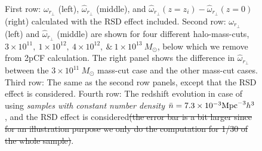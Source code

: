 \documentclass[iop]{emulateapj}
\providecommand{\DIFdel}[1]{{\protect\color{red}\sout{#1}}}                      %
\providecommand{\DIFdelFL}[1]{\DIFdel{#1}} %
\providecommand{\DIFdelbeginFL}{} %
\providecommand{\DIFdelendFL}{} %
\begin{document}
\begin{figure}
   \caption{\label{fig_sys}
  First row: $\omega_{r_\perp}$ (left), $\hat{\omega}_{r_\perp}$ (middle), and $\hat\omega_{r_\perp}(z=z_i)-\hat\omega_{r_\perp}(z=0)$ (right) calculated with the RSD effect included.
  Second row: $\omega_{r_\perp}$ (left) and $\hat{\omega}_{r_\perp}$ (middle) are shown for four different halo-mass-cuts, $3\times 10^{11},~1\times 10^{12},~4\times 10^{12},~\&~1\times 10^{13}~M_\odot$, 
  below which we remove from 2pCF calculation. 
  The right panel shows the difference in $\hat{\omega}_{r_\perp}$ between the $3\times 10^{11}~M_\odot$ mass-cut case and the other mass-cut cases. 
  Third row: The same as the second row panels, except that the RSD effect is considered.
  Fourth row: The redshift evolution in case of using {\it samples with constant number density} $\bar n=7.3\times 10^{-3} {\rm Mpc}^{-3}h^3$, 
  and the RSD effect is considered\DIFdelbeginFL \DIFdelFL{(the error bar is a bit larger since for an illustration purpose we only do the computation for 1/30 of the whole sample)}\DIFdelendFL . } 
\end{figure}
\end{document}
